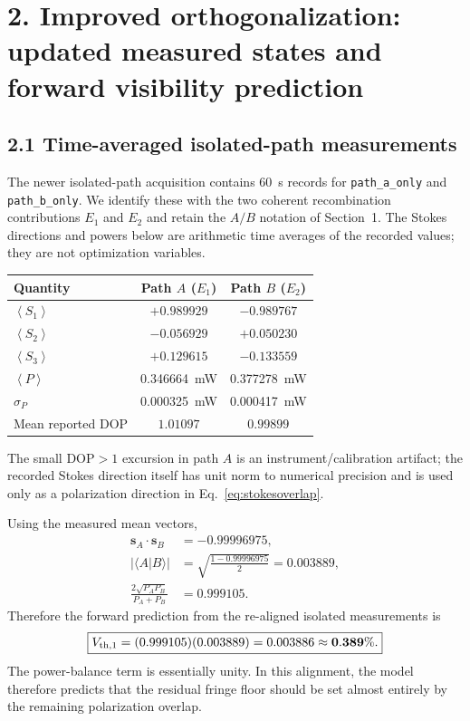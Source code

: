 \documentclass[10pt]{article}
\newcommand{\vect}[1]{\bm{#1}}
\newcommand{\avg}[1]{\left\langle #1\right\rangle}
\begin{document}
\section*{2. Improved orthogonalization: updated measured states and forward visibility prediction}

\subsection*{2.1 Time-averaged isolated-path measurements}
The newer isolated-path acquisition contains \SI{60}{s} records for \texttt{path\_a\_only} and \texttt{path\_b\_only}. We identify these with the two coherent recombination contributions $E_1$ and $E_2$ and retain the $A/B$ notation of Section~1. The Stokes directions and powers below are arithmetic time averages of the recorded values; they are not optimization variables.

\begin{center}
\begin{tabular}{lcc}
\toprule
Quantity & Path $A$ ($E_1$) & Path $B$ ($E_2$) \\
\midrule
$\avg{S_1}$ & $+0.989929$ & $-0.989767$ \\
$\avg{S_2}$ & $-0.056929$ & $+0.050230$ \\
$\avg{S_3}$ & $+0.129615$ & $-0.133559$ \\
$\avg{P}$ & \SI{0.346664}{mW} & \SI{0.377278}{mW} \\
$\sigma_P$ & \SI{0.000325}{mW} & \SI{0.000417}{mW} \\
Mean reported DOP & $1.01097$ & $0.99899$ \\
\bottomrule
\end{tabular}
\end{center}

The small $\mathrm{DOP}>1$ excursion in path $A$ is an instrument/calibration artifact; the recorded Stokes direction itself has unit norm to numerical precision and is used only as a polarization direction in Eq.~\eqref{eq:stokesoverlap}.

Using the measured mean vectors,
\begin{align}
\vect{s}_A\cdot\vect{s}_B&=-0.99996975,\\
\left|\langle A\vert B\rangle\right|
&=\sqrt{\frac{1-0.99996975}{2}}=0.003889,\\
\frac{2\sqrt{P_AP_B}}{P_A+P_B}&=0.999105.
\end{align}
Therefore the forward prediction from the re-aligned isolated measurements is
\begin{equation}
\boxed{V_{\rm th,1}=(0.999105)(0.003889)=0.003886\approx\mathbf{0.389\%}.}
\label{eq:newprediction}
\end{equation}
The power-balance term is essentially unity. In this alignment, the model therefore predicts that the residual fringe floor should be set almost entirely by the remaining polarization overlap.
\end{document}
